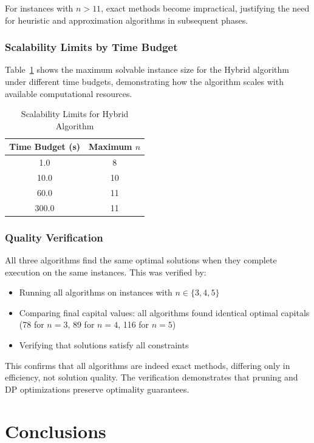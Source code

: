 \documentclass[12pt]{article}
\begin{document}
For instances with $n > 11$, exact methods become impractical, justifying the need for heuristic and approximation algorithms in subsequent phases.

\subsubsection{Scalability Limits by Time Budget}

Table~\ref{tab:scalability} shows the maximum solvable instance size for the Hybrid algorithm under different time budgets, demonstrating how the algorithm scales with available computational resources.

\begin{table}[h]
\centering
\caption{Scalability Limits for Hybrid Algorithm}
\label{tab:scalability}
\begin{tabular}{cc}
\toprule
Time Budget (s) & Maximum $n$ \\
\midrule
1.0 & 8 \\
10.0 & 10 \\
60.0 & 11 \\
300.0 & 11 \\
\bottomrule
\end{tabular}
\end{table}

\subsubsection{Quality Verification}

All three algorithms find the same optimal solutions when they complete execution on the same instances. This was verified by:
\begin{itemize}
    \item Running all algorithms on instances with $n \in \{3, 4, 5\}$
    \item Comparing final capital values: all algorithms found identical optimal capitals (78 for $n=3$, 89 for $n=4$, 116 for $n=5$)
    \item Verifying that solutions satisfy all constraints
\end{itemize}

This confirms that all algorithms are indeed exact methods, differing only in efficiency, not solution quality. The verification demonstrates that pruning and DP optimizations preserve optimality guarantees.

\section{Conclusions}
\label{sec:conclusions}
\end{document}
